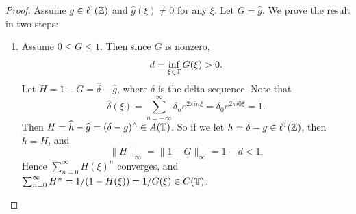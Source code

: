 \begin{proof}
  Assume $g \in \ell^1(\mathbb{Z})$ and
  $\widehat{g}(\xi) \ne 0$ for any
  $\xi$. Let $G = \widehat{g}$.
  We prove the result in two steps:
  \begin{enumerate}
    \item Assume $0 \le G \le 1$.
      Then since $G$ is nonzero,
      \[
        d = \inf_{\xi \in \mathbb{T}} G(\xi) > 0.
      \]
      Let $H = 1 - G = \widehat{\delta} - \widehat{g}$,
      where $\delta$ is the
      delta sequence. Note that
      \[
        \widehat{\delta}(\xi)
        = \sum_{n = -\infty}^\infty \delta_n e^{2\pi i n \xi}
        = \delta_0 e^{2\pi i 0 \xi}
        = 1.
      \]
      Then $H = \widehat{h} - \widehat{g} = (\delta - g)^\wedge \in A(\mathbb{T})$.
      So if we let
      $h = \delta - g \in \ell^1(\mathbb{Z})$,
      then
      $\widehat{h} = H$, and
      \[
        \|H\|_\infty
        = \|1 - G\|_\infty
        = 1 - d < 1.
      \]
      Hence
      $\sum_{n = 0}^\infty H(\xi)^n$
      converges, and
      $\sum_{n = 0}^\infty H^n = 1 / (1 - H(\xi)) = 1 / G(\xi) \in C(\mathbb{T})$.


\end{enumerate}
\end{proof}
